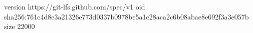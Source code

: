 version https://git-lfs.github.com/spec/v1
oid sha256:761c4d8e3a21326e773d0337b0978be5a1c28aca2c6b08abae8e692f3a3e057b
size 22000
